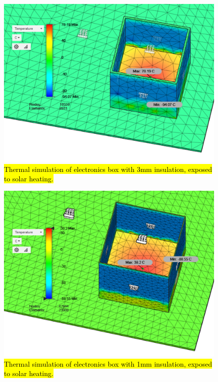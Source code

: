 	\begin{figure}[H]
    \centering    	
    \includegraphics[scale=0.6]{4-experiment-design/img/mechanical/3mmthickheat.PNG}
	\caption{\hl{Thermal simulation of electronics box with 3mm insulation, exposed to solar heating.}}
	\label{fig:3mmthickheat}
	\end{figure}

	\begin{figure}[H]
    \centering  
    \includegraphics[scale=0.65]{4-experiment-design/img/mechanical/1mmthickheat.PNG}
	\caption{\hl{Thermal simulation of electronics box with 1mm insulation, exposed to solar heating.}}
	\label{fig:1mmthickheat}    
    	\end{figure}
    	
